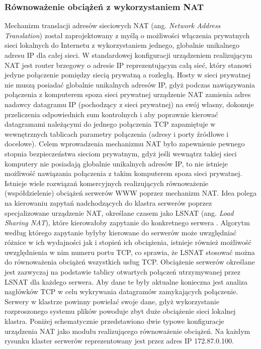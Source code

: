 \subsubsection{Równoważenie obciążeń z wykorzystaniem NAT}

Mechanizm translacji adresów sieciowych NAT (ang. \emph{Network Address Translation}) został zaprojektowany z 
myślą o możliwości włączenia prywatnych sieci lokalnych do Internetu z wykorzystaniem jednego, globalnie 
unikalnego adresu IP dla całej sieci. W standardowej konfiguracji urządzeniem realizującym NAT jest router 
brzegowy o adresie IP reprezentującym całą sieć, który stanowi jedyne połączenie pomiędzy siecią prywatną a 
rozległą. Hosty w sieci prywatnej nie muszą posiadać globalnie unikalnych adresów IP, gdyż podczas nawiązywania 
połączenia z komputerem spoza sieci prywatnej urządzenie NAT zamienia adres nadawcy datagramu IP (pochodzący z 
sieci prywatnej) na swój własny, dokonuje przeliczenia odpowiednich sum kontrolnych i aby poprawnie kierować 
datagramami należącymi do jednego połączenia TCP zapamiętuje w wewnętrznych tablicach parametry połączenia 
(adresy i porty źródłowe i docelowe). Celem wprowadzenia mechanizmu NAT było zapewnienie pewnego stopnia 
bezpieczeństwa sieciom prywatnym, gdyż jeśli wewnątrz takiej sieci komputery nie posiadają globalnie unikalnych 
adresów IP, to nie istnieje możliwość  nawiązania połączenia z takim komputerem spoza sieci prywatnej. 
Istnieje wiele rozwiązań komercyjnych realizujących równoważenie (współdzielenie)  obciążeń serwerów 
WWW poprzez mechanizm NAT. Idea polega na kierowaniu zapytań nadchodzących do klastra serwerów poprzez 
specjalizowane urządzenie NAT, określane czasem jako LSNAT (ang. \emph{Load Sharing NAT}), które kierowałoby zapytanie 
do konkretnego serwera \cite{barylo7}. Algorytm według którego zapytanie byłyby kierowane do serwerów może uwzględniać 
różnice w ich wydajności jak i stopień ich obciążenia, istnieje również możliwość uwzględnienia w nim numeru 
portu TCP, co sprawia, że LSNAT stosować można do równoważenia obciążeń wszystkich usług TCP. Obciążenie 
serwerów określane jest zazwyczaj na podstawie tablicy otwartych połączeń utrzymywanej przez LSNAT dla każdego 
serwera. Aby dane te były aktualne konieczna jest analiza nagłówków TCP w celu wykrywania datagramów 
zamykających połączenie. Serwery w klastrze powinny powielać swoje dane, gdyż wykorzystanie rozproszonego 
systemu plików powoduje zbyt duże obciążenie sieci lokalnej klastra. Poniżej schematycznie przedstawiono dwie 
typowe konfiguracje urządzenia NAT jako modułu realizującego  równoważenie obciążeń. Na każdym rysunku klaster 
serwerów reprezentowany jest przez adres IP 172.87.0.100.


